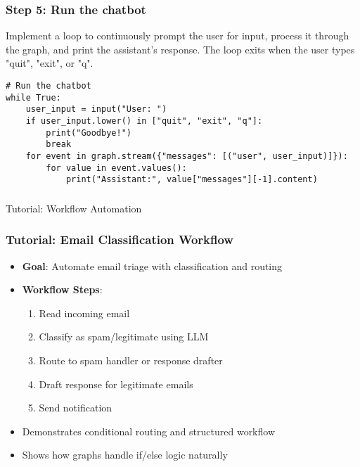 \begin{frame}[fragile]\frametitle{Step 5: Run the chatbot}

 Implement a loop to continuously prompt the user for input, process it through the graph, and print the assistant's response. The loop exits when the user types "quit", "exit", or "q".
 
      \begin{lstlisting}
# Run the chatbot
while True:
    user_input = input("User: ")
    if user_input.lower() in ["quit", "exit", "q"]:
        print("Goodbye!")
        break
    for event in graph.stream({"messages": [("user", user_input)]}):
        for value in event.values():
            print("Assistant:", value["messages"][-1].content)
      \end{lstlisting}
\end{frame}

\begin{frame}[fragile]\frametitle{}
\begin{center}
{\Large Tutorial: Workflow Automation}
\end{center}
\end{frame}

\begin{frame}[fragile]\frametitle{Tutorial: Email Classification Workflow}
      \begin{itemize}
        \item \textbf{Goal}: Automate email triage with classification and routing
        \item \textbf{Workflow Steps}:
        \begin{enumerate}
            \item Read incoming email
            \item Classify as spam/legitimate using LLM
            \item Route to spam handler or response drafter
            \item Draft response for legitimate emails
            \item Send notification
        \end{enumerate}
        \item Demonstrates conditional routing and structured workflow
        \item Shows how graphs handle if/else logic naturally
      \end{itemize}
\end{frame}

